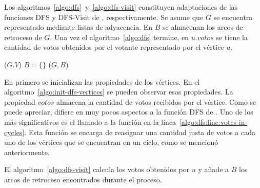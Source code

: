 
Los algoritmos~\ref{algo:dfs}~y~\ref{algo:dfs-visit}  constituyen adaptaciones   de las funciones DFS y DFS-Visit de \cite{intro-to-algo-3}, respectivamente. Se asume que $G$ se encuentra representado mediante listas de adyacencia. En $B$ se almacenan los arcos de retroceso de $G$.    Una vez el algoritmo~\ref{algo:dfs} termine, en $u.votos$ se tiene la cantidad de votos obtenidos por el votante representado por el v\'ertice $u$. 

\begin{algorithm}[!h]
    \caption{\dfscaption}
    \label{algo:dfs}
    \DontPrintSemicolon
    \SetAlgoLined
    \BlankLine

    \initdfsvertices($G.V$)\;
    $B = \{\}$\;
    \cyclevotescaption($G, B$)\; \label{algo:dfs:line:votes-in-cycles}
\end{algorithm}

En \dfscaption \;primero se inicializan las propiedades de los v\'ertices. En el algoritmo~\ref{algo:init-dfs-vertices} se pueden observar esas propiedades. La propiedad $votos$ almacena la cantidad de votos recibidos por el v\'ertice. Como se puede apreciar,  \dfscaption \;difiere en muy pocos aspectos a la funci\'on DFS de \cite{intro-to-algo-3}. Uno de los m\'as significativos es el llamado a la funci\'on \cyclevotescaption \;en la l\'inea~\ref{algo:dfs:line:votes-in-cycles}. Esta funci\'on se encarga de reasignar una cantidad justa de votos a cada uno de los v\'ertices que se encuentran en un ciclo, como se mencion\'o anteriormente.  

\begin{algorithm}[!h]
    \caption{\initdfsvertices}
    \label{algo:init-dfs-vertices}
    \DontPrintSemicolon
    \SetAlgoLined
    \BlankLine

\end{algorithm}

El algoritmo~\ref{algo:dfs-visit} calcula los votos obtenidos por $u$ y a\~nade a $B$ los arcos de retroceso encontrados durante el proceso.


